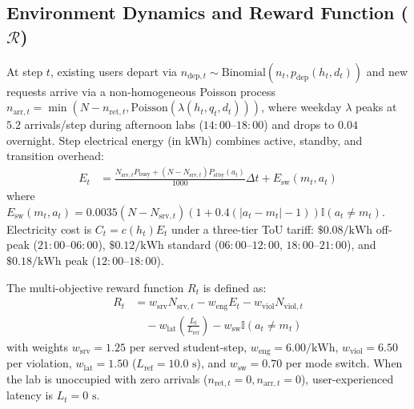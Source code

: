 \documentclass[9pt,twocolumn,a4paper]{extarticle}
\begin{document}
\subsection{Environment Dynamics and Reward Function ($\mathcal{R}$)}
At step $t$, existing users depart via $n_{\text{dep},t} \sim \text{Binomial}(n_t, p_{\text{dep}}(h_t, d_t))$ and new requests arrive via a non-homogeneous Poisson process $n_{\text{arr},t} = \min(N - n_{\text{ret},t}, \text{Poisson}(\lambda(h_t, q_t, d_t)))$, where weekday $\lambda$ peaks at $5.2$ arrivals/step during afternoon labs ($14{:}00\text{--}18{:}00$) and drops to $0.04$ overnight. Step electrical energy (in kWh) combines active, standby, and transition overhead:
\begin{equation}
\begin{split}
    E_t &= \frac{N_{\text{srv},t} P_{\text{busy}} + (N - N_{\text{srv},t}) P_{\text{stby}}(a_t)}{1000}\Delta t + E_{\text{sw}}(m_t, a_t)
\end{split}
\end{equation}
where $E_{\text{sw}}(m_t, a_t) = 0.0035 (N - N_{\text{srv},t})(1 + 0.4(|a_t - m_t|-1))\mathbb{I}(a_t \neq m_t)$. Electricity cost is $C_t = c(h_t) E_t$ under a three-tier ToU tariff: $\$0.08/\text{kWh}$ off-peak ($21{:}00\text{--}06{:}00$), $\$0.12/\text{kWh}$ standard ($06{:}00\text{--}12{:}00$, $18{:}00\text{--}21{:}00$), and $\$0.18/\text{kWh}$ peak ($12{:}00\text{--}18{:}00$).

The multi-objective reward function $R_t$ is defined as:
\begin{equation}
\begin{split}
    R_t &= w_{\text{srv}} N_{\text{srv},t} - w_{\text{eng}} E_t - w_{\text{viol}} N_{\text{viol},t} \\
        &\quad - w_{\text{lat}} \left(\frac{L_t}{L_{\text{ref}}}\right) - w_{\text{sw}} \mathbb{I}(a_t \neq m_t)
\end{split}
\end{equation}
with weights $w_{\text{srv}}=1.25$ per served student-step, $w_{\text{eng}}=6.00/\text{kWh}$, $w_{\text{viol}}=6.50$ per violation, $w_{\text{lat}}=1.50$ ($L_{\text{ref}}=10.0\text{ s}$), and $w_{\text{sw}}=0.70$ per mode switch. When the lab is unoccupied with zero arrivals ($n_{\text{ret},t}=0, n_{\text{arr},t}=0$), user-experienced latency is $L_t = 0\text{ s}$.
\end{document}
